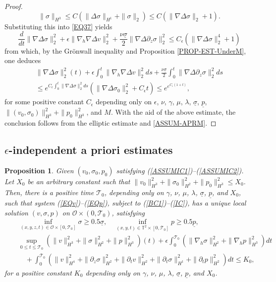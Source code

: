 \documentclass[12pt,reqno]{amsart}
\numberwithin{equation}{section}
\newtheorem{proposition}[theorem]{Proposition}
\begin{document}
\begin{proof}
$$
\|\sigma\|_{H^3}\leq C(\|\Delta\sigma\|_{H^1}+\|\sigma\|_2)\leq C(\|\nabla\Delta\sigma\|_2+1).
$$
Substituting this into \eqref{EQ37} yields
$$
  \frac{d}{dt}\|\nabla\Delta\sigma\|_2^2+\epsilon\|\nabla_h\nabla\Delta v\|_2^2+\frac{\nu\underline\sigma}{2}\|\nabla\Delta\partial_z\sigma\|_2^2
  \leq C_\epsilon(\|\nabla\Delta\sigma\|_2^4+1)
$$
from which, by the Gr\"onwall inequality and Proposition \ref{PROP-EST-UnderM}, one deduces
\begin{eqnarray*}
  \|\nabla\Delta\sigma\|_2^2(t)+\epsilon\int_0^t\|\nabla_h\nabla\Delta v\|_2^2ds+\frac{\nu\underline\sigma}{2}\int_0^t\|\nabla\Delta\partial_z\sigma\|_2^2ds\\
  \leq e^{C_\epsilon\int_0^t\|\nabla\Delta\sigma\|_2^2ds}(\|\nabla\Delta\sigma_0\|_2^2+C_\epsilon t)\leq e^{e^{C_\epsilon(1+t)}},
\end{eqnarray*}
for some positive constant $C_\epsilon$ depending only on $\epsilon$, $\nu$, $\gamma$, $\mu$, $\lambda$, $\underline\sigma$, $\underline p$,
$\|(v_0,\sigma_0)\|_{H^3}^2+\|p_0\|_{H^3}^2$, and $M$.
With the aid of the above estimate, the conclusion follows from the elliptic estimate and \eqref{ASSUM-APRM}.
\end{proof}

\subsection{$\epsilon$-independent a priori estimates}

\begin{proposition}
  \label{PROP-APR}
Given $(v_{0}, \sigma_{0}, p_{0})$ satisfying (\ref{ASSUMIC1})--(\ref{ASSUMIC2}). Let $X_0$ be an arbitrary constant such that
$\|v_{0}\|_{H^3}^2+\|\sigma_{0}\|_{H^2}^2+\|p_0\|_{H^3}^2\leq X_0$. Then, there is a positive time $\mathcal T_0$,
depending only on $\gamma$, $\nu$, $\mu$, $\lambda$, $\underline\sigma$, $\underline p$, and
  $X_0$, such that system (\ref{EQv})--(\ref{EQp}),
  subject to (\ref{BC1})--(\ref{IC}), has a unique local solution $(v,\sigma,p)$ on $\mathcal O\times(0,\mathcal T_0)$,
  satisfying
  \begin{eqnarray*}
  &&\inf_{(x,y,z,t)\in\mathcal O\times[0,\mathcal T_0]}\sigma\geq0.5\underline\sigma,\quad \inf_{(x,y,t)\in\mathbb T^2\times[0,\mathcal T_0]}p\geq0.5\underline p,\\
  &&\sup_{0\leq t\leq\mathcal T_0}(\|v\|_{H^3}^2+\|\sigma\|_{H^2}^2+\|p\|_{H^3}^2)(t)+\epsilon\int_0^{\mathcal T_0}(\|\nabla_h\sigma\|_{H^2}^2+\|\nabla_hp\|_{H^3}^2)dt\nonumber\\
  &&\, \, ~~~+\int_0^{\mathcal T_0}(\|v\|_{H^4}^2+\|\partial_z\sigma\|_{H^2}^2+\|\partial_tv\|_{H^2}^2+\|\partial_t\sigma\|_{H^1}^2+\|\partial_tp\|_{H^2}^2)dt \leq K_0,
  \end{eqnarray*}
  for a positive constant $K_0$ depending only on $\gamma$, $\nu$, $\mu$, $\lambda$, $\underline\sigma$, $\underline p$, and
  $X_0$.
\end{proposition}
\end{document}
